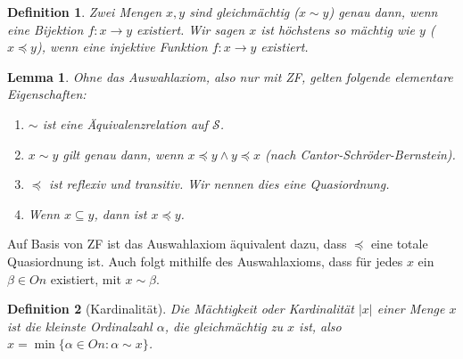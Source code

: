 \documentclass[german]{article}
\theoremstyle{break}
\theoremstyle{def_style}
\newtheorem{definition}{Definition}[section]
\theoremstyle{def_style}
\theoremstyle{lemma_style}
\newtheorem{lemma}{Lemma}[subsection]
\begin{document}
\begin{definition}
	Zwei Mengen $x,y$ sind \textit{gleichmächtig} ($x\sim y$) genau dann, wenn eine Bijektion $f:x\to y$ existiert. Wir sagen $x$ ist höchstens so mächtig wie $y$ ($x\preceq y$), wenn eine injektive Funktion $f:x\to y$ existiert.
\end{definition}

\begin{lemma}
	Ohne das Auswahlaxiom, also nur mit ZF, gelten folgende elementare Eigenschaften:
	\begin{enumerate}
		\item $\sim$ ist eine Äquivalenzrelation auf $\mathcal{S}$.
		\item $x\sim y$ gilt genau dann, wenn $x\preceq y \land y \preceq x$ (nach Cantor-Schröder-Bernstein).
		\item $\preceq$ ist reflexiv und transitiv. Wir nennen dies eine \textit{Quasiordnung}.
		\item Wenn $x\subseteq y$, dann ist $x\preceq y$.
	\end{enumerate}
\end{lemma}

Auf Basis von ZF ist das Auswahlaxiom äquivalent dazu, dass $\preceq$ eine totale Quasiordnung ist. Auch folgt mithilfe des Auswahlaxioms, dass für jedes $x$ ein $\beta\in On$ existiert, mit $x\sim\beta$.

\begin{definition}[Kardinalität]
	Die \textit{Mächtigkeit} oder \textit{Kardinalität} $\vert x \vert$ einer Menge $x$ ist die kleinste Ordinalzahl $\alpha$, die gleichmächtig zu $x$ ist, also $x=\min\{\alpha\in On : \alpha\sim x\}$.
\end{definition}
\end{document}
